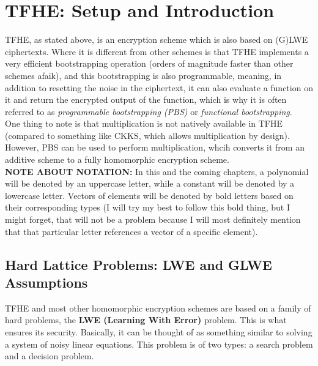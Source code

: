 \documentclass{report}
\begin{document}
\section{TFHE: Setup and Introduction}
TFHE, as stated above, is an encryption scheme which is also based on (G)LWE ciphertexts. Where it is different from other schemes is that TFHE implements a very efficient bootstrapping operation (orders of magnitude faster than other schemes afaik), and this bootstrapping is also programmable, meaning, in addition to resetting the noise in the ciphertext, it can also evaluate a function on it and return the encrypted output of the function, which is why it is often referred to as \textit{programmable bootstrapping (PBS)} or \textit{functional bootstrapping}.\\
One thing to note is that multiplication is not natively available in TFHE (compared to something like CKKS, which allows multiplication by design). However, PBS can be used to perform multiplication, whcih converts it from an additive scheme to a fully homomorphic encryption scheme.\\

\textbf{NOTE ABOUT NOTATION:} In this and the coming chapters, a polynomial will be denoted by an uppercase letter, while a constant will be denoted by a lowercase letter. Vectors of elements will be denoted by bold letters based on their corresponding types (I will try my best to follow this bold thing, but I might forget, that will not be a problem because I will most definitely mention that that particular letter references a vector of a specific element).

\subsection{Hard Lattice Problems: LWE and GLWE Assumptions}
TFHE and most other homomorphic encryption schemes are based on a family of hard problems, the \textbf{LWE (Learning With Error)} problem. This is what ensures its security. Basically, it can be thought of as something similar to solving a system of noisy linear equations. This problem is of two types: a search problem and a decision problem.
\end{document}
